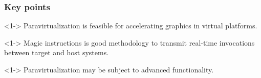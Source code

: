 
\begin{frame}
\frametitle{Key points}

\begin{thm}<1->
Paravirtualization is feasible for accelerating graphics in virtual platforms.
\end{thm}

\begin{thm}<1->
Magic instructions is good methodology to transmit real-time invocations between target and host systems.
\end{thm}

\begin{thm}<1->
Paravirtualization may be subject to advanced functionality.
\end{thm}

\end{frame}